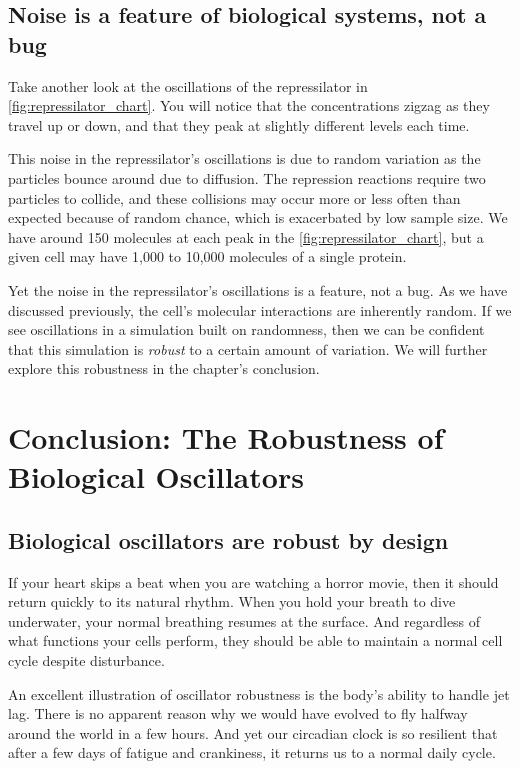 \subsection{Noise is a feature of biological systems, not a bug}

Take another look at the oscillations of the repressilator in \autoref{fig:repressilator_chart}. You will notice that the concentrations zigzag as they travel up or down, and that they peak at slightly different levels each time.

This noise in the repressilator's oscillations is due to random variation as the particles bounce around due to diffusion. The repression reactions require two particles to collide, and these collisions may occur more or less often than expected because of random chance, which is exacerbated by low sample size. We have around 150 molecules at each peak in the \autoref{fig:repressilator_chart}, but a given cell may have 1,000 to 10,000 molecules of a single protein.

Yet the noise in the repressilator's oscillations is a feature, not a bug. As we have discussed previously, the cell's molecular interactions are inherently random. If we see oscillations in a simulation built on randomness, then we can be confident that this simulation is \textit{robust} to a certain amount of variation. We will further explore this robustness in the chapter's conclusion.\\

\FloatBarrier
{}

\section{Conclusion: The Robustness of Biological Oscillators}
\label{sec:biological_oscillators_must_be_robust}

\subsection{Biological oscillators are robust by design}

If your heart skips a beat when you are watching a horror movie, then it should return quickly to its natural rhythm. When you hold your breath to dive underwater, your normal breathing resumes at the surface. And regardless of what functions your cells perform, they should be able to maintain a normal cell cycle despite disturbance.

An excellent illustration of oscillator robustness is the body's ability to handle jet lag. There is no apparent reason why we would have evolved to fly halfway around the world in a few hours. And yet our circadian clock is so resilient that after a few days of fatigue and crankiness, it returns us to a normal daily cycle.

